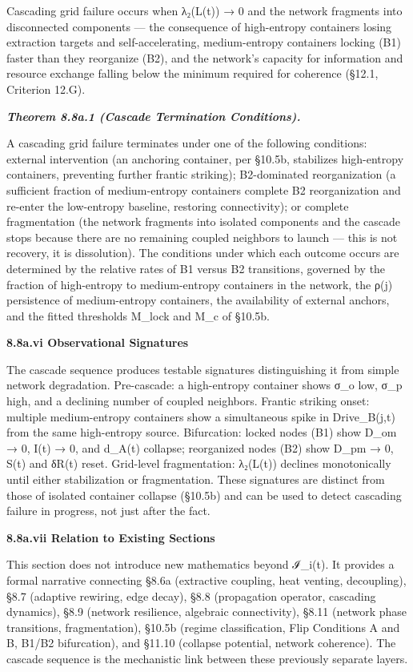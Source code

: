 \documentclass[
]{article}
\begin{document}
Cascading grid failure occurs when λ₂(L(t)) → 0 and the network
fragments into disconnected components --- the consequence of
high-entropy containers losing extraction targets and self-accelerating,
medium-entropy containers locking (B1) faster than they reorganize (B2),
and the network's capacity for information and resource exchange falling
below the minimum required for coherence (§12.1, Criterion 12.G).

\emph{\textbf{Theorem 8.8a.1 (Cascade Termination Conditions).}}

A cascading grid failure terminates under one of the following
conditions: external intervention (an anchoring container, per §10.5b,
stabilizes high-entropy containers, preventing further frantic
striking); B2-dominated reorganization (a sufficient fraction of
medium-entropy containers complete B2 reorganization and re-enter the
low-entropy baseline, restoring connectivity); or complete fragmentation
(the network fragments into isolated components and the cascade stops
because there are no remaining coupled neighbors to launch --- this is
not recovery, it is dissolution). The conditions under which each
outcome occurs are determined by the relative rates of B1 versus B2
transitions, governed by the fraction of high-entropy to medium-entropy
containers in the network, the ρ(j) persistence of medium-entropy
containers, the availability of external anchors, and the fitted
thresholds M\_lock and M\_c of §10.5b.

\textbf{8.8a.vi Observational Signatures}

The cascade sequence produces testable signatures distinguishing it from
simple network degradation. Pre-cascade: a high-entropy container shows
σ\_o low, σ\_p high, and a declining number of coupled neighbors.
Frantic striking onset: multiple medium-entropy containers show a
simultaneous spike in Drive\_B(j,t) from the same high-entropy source.
Bifurcation: locked nodes (B1) show D\_om → 0, I(t) → 0, and d\_A(t)
collapse; reorganized nodes (B2) show D\_pm → 0, S(t) and δR(t) reset.
Grid-level fragmentation: λ₂(L(t)) declines monotonically until either
stabilization or fragmentation. These signatures are distinct from those
of isolated container collapse (§10.5b) and can be used to detect
cascading failure in progress, not just after the fact.

\textbf{8.8a.vii Relation to Existing Sections}

This section does not introduce new mathematics beyond ℐ\_i(t). It
provides a formal narrative connecting §8.6a (extractive coupling, heat
venting, decoupling), §8.7 (adaptive rewiring, edge decay), §8.8
(propagation operator, cascading dynamics), §8.9 (network resilience,
algebraic connectivity), §8.11 (network phase transitions,
fragmentation), §10.5b (regime classification, Flip Conditions A and B,
B1/B2 bifurcation), and §11.10 (collapse potential, network coherence).
The cascade sequence is the mechanistic link between these previously
separate layers.
\end{document}
